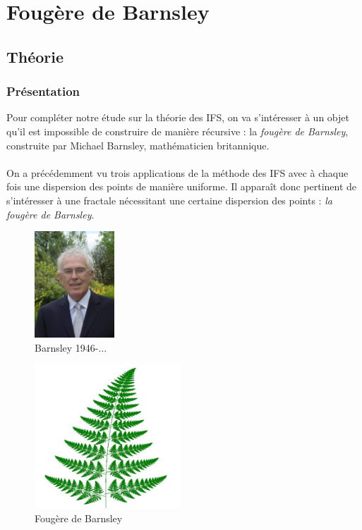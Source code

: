\documentclass[a4paper,10pt]{report}
\begin{document}
\newpage
\section{Fougère de Barnsley}
\subsection{Théorie}
\subsubsection{Présentation}
\begin{minipage}[c]{.70\linewidth}
	\indent Pour compléter notre étude sur la théorie des IFS, on va s'intéresser à un objet qu'il est impossible de construire de manière récursive : la \textit{fougère de Barnsley}, construite par Michael Barnsley, mathématicien britannique. \\ \\
	On a précédemment vu trois applications de la méthode des IFS avec à chaque fois une dispersion des points de manière uniforme. Il apparaît donc pertinent de s'intéresser à une fractale nécessitant une certaine dispersion des points : \textit{la fougère de Barnsley}.
\end{minipage} \hfill
\begin{minipage}[c]{.05\linewidth}
\end{minipage} \hfill
\begin{minipage}[c]{.21\linewidth}
	\begin{figure}[H]
	\includegraphics[height=4cm]{mr_barnsley.jpg}
	\caption{Barnsley 1946-...}
	\end{figure}
\end{minipage}

\begin{figure}[H]
\centering
\caption{Fougère de Barnsley}
\includegraphics[width=5.5cm]{barnsley.jpg}
\end{figure}
\end{document}
